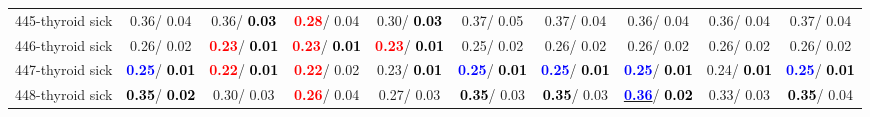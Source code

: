 \begin{table}[h]
\begin{center}
{\begin{tabular}{lc|c|c|c|c|c|c|c|c}
445-thyroid sick &   0.36/  0.04 &   0.36/\textcolor{black}{\textbf{  0.03}} & \textcolor{red}{\textbf{  0.28}}/  0.04 &   0.30/\textcolor{black}{\textbf{  0.03}} &   0.37/  0.05 &   0.37/  0.04 &   0.36/  0.04 &   0.36/  0.04 &   0.37/  0.04 \\
446-thyroid sick &   0.26/  0.02 & \textcolor{red}{\textbf{  0.23}}/\textcolor{black}{\textbf{  0.01}} & \textcolor{red}{\textbf{  0.23}}/\textcolor{black}{\textbf{  0.01}} & \textcolor{red}{\textbf{  0.23}}/\textcolor{black}{\textbf{  0.01}} &   0.25/  0.02 &   0.26/  0.02 &   0.26/  0.02 &   0.26/  0.02 &   0.26/  0.02 \\
447-thyroid sick & \textcolor{blue}{\textbf{  0.25}}/\textcolor{black}{\textbf{  0.01}} & \textcolor{red}{\textbf{  0.22}}/\textcolor{black}{\textbf{  0.01}} & \textcolor{red}{\textbf{  0.22}}/  0.02 &   0.23/\textcolor{black}{\textbf{  0.01}} & \textcolor{blue}{\textbf{  0.25}}/\textcolor{black}{\textbf{  0.01}} & \textcolor{blue}{\textbf{  0.25}}/\textcolor{black}{\textbf{  0.01}} & \textcolor{blue}{\textbf{  0.25}}/\textcolor{black}{\textbf{  0.01}} &   0.24/\textcolor{black}{\textbf{  0.01}} & \textcolor{blue}{\textbf{  0.25}}/\textcolor{black}{\textbf{  0.01}} \\
448-thyroid sick & \textcolor{black}{\textbf{  0.35}}/\textcolor{black}{\textbf{  0.02}} &   0.30/  0.03 & \textcolor{red}{\textbf{  0.26}}/  0.04 &   0.27/  0.03 & \textcolor{black}{\textbf{  0.35}}/  0.03 & \textcolor{black}{\textbf{  0.35}}/  0.03 & \underline{\textcolor{blue}{\textbf{  0.36}}}/\textcolor{black}{\textbf{  0.02}} &   0.33/  0.03 & \textcolor{black}{\textbf{  0.35}}/  0.04 \\\end{tabular}}\label{stratsALCKappa13Allallb}
\end{center}
\end{table}
